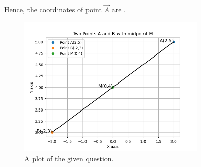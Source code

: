\documentclass[journal]{IEEEtran}
\begin{document}
Hence, the coordinates of point $\vec{A}$ are  .

\begin{figure}[h] %
    \centering
    \includegraphics[width=0.8\textwidth]{Graph1.png}
	\caption{A plot of the given question.}
    \label{fig:Plot1}
\end{figure}
 
\end{document}

